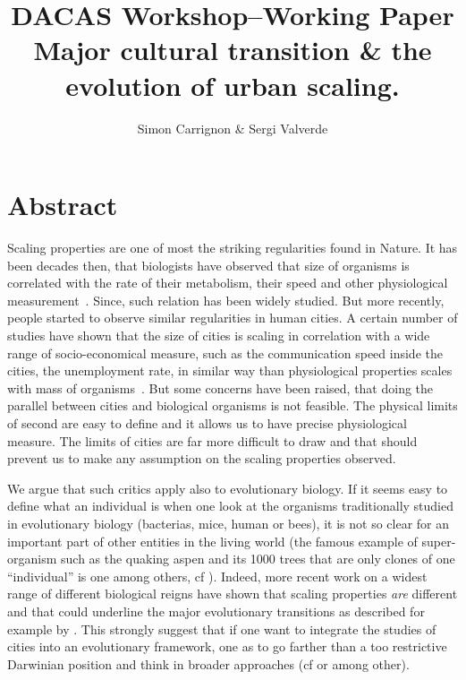 \documentclass[a4paper,11pt]{article}
\title{DACAS Workshop--Working Paper\\
Major cultural transition \& the evolution of urban scaling.
}
\author{Simon Carrignon \& Sergi Valverde}
\date{}
\begin{document}
\maketitle

\section*{Abstract}
Scaling properties are one of most the striking regularities found in Nature. It has been decades then, that biologists have observed that size of organisms is correlated with the rate of their metabolism, their speed and other  physiological measurement~\citep{bonner2011size}. Since, such relation has been widely studied. But more recently, people started to observe similar regularities in human cities. A certain number of studies have shown that the size of cities is scaling in correlation with a wide range of socio-economical measure, such as the communication speed inside the cities, the unemployment rate, in similar way than physiological properties scales with mass of organisms~\citep{batty2008thesizescaleandshapeofcities,bettencourt2007growthinnovationscalingandthepaceoflifeincities}. 
But some concerns have been raised, that doing the parallel between cities and biological organisms is not feasible. The physical limits of second are easy to define and it allows us to have precise physiological measure. The limits of cities are far more difficult to draw and that should prevent us to make any assumption on the scaling properties observed. 

We argue that such critics apply also to evolutionary biology. If it seems easy to define what an individual is when one look at the organisms traditionally studied in evolutionary biology (bacterias, mice, human or bees), it is not so clear for an important part of other entities in the living world (the famous example of super-organism such as the quaking aspen and its 1000 trees that are only clones of one ``individual'' is one among others, cf \cite{bouchard2011darwinismwithoutpopulationsamoreinclusiveunderstandingofsotf}). Indeed, more recent work on a widest range of different biological reigns have shown that scaling properties \emph{are} different \citep{delong2010shiftsinmetabolicscalingproductionandefficiencyacrossmajorevolutionarytransitionsoflife} and that could underline the major evolutionary transitions as described for example by \cite{maynardsmith1997major}. This strongly suggest that if one want to integrate the studies of cities into an evolutionary framework, one as to go farther than a too restrictive Darwinian position and think in broader approaches (cf \cite{godfrey2009darwinian} or \cite{jablonka2014evolution} among other). 
\end{document}
